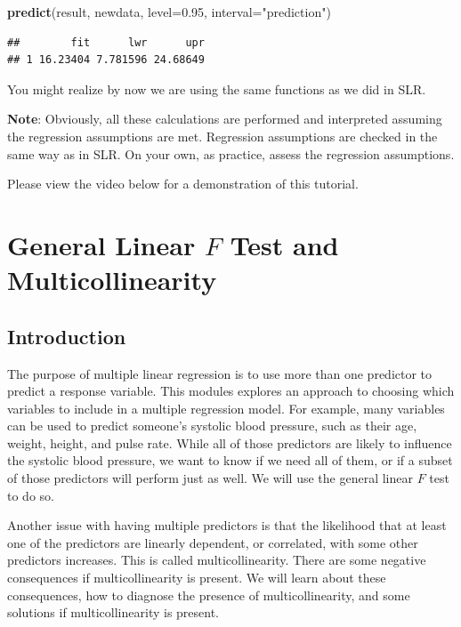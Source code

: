\documentclass[
]{book}
\newenvironment{Shaded}{\begin{snugshade}}{\end{snugshade}}
\newcommand{\AttributeTok}[1]{\textcolor[rgb]{0.13,0.29,0.53}{#1}}
\newcommand{\FloatTok}[1]{\textcolor[rgb]{0.00,0.00,0.81}{#1}}
\newcommand{\FunctionTok}[1]{\textcolor[rgb]{0.13,0.29,0.53}{\textbf{#1}}}
\newcommand{\NormalTok}[1]{#1}
\newcommand{\StringTok}[1]{\textcolor[rgb]{0.31,0.60,0.02}{#1}}
\begin{document}
\begin{Shaded}
\begin{Highlighting}[]
\FunctionTok{predict}\NormalTok{(result, newdata, }\AttributeTok{level=}\FloatTok{0.95}\NormalTok{,}
        \AttributeTok{interval=}\StringTok{"prediction"}\NormalTok{)}
\end{Highlighting}
\end{Shaded}

\begin{verbatim}
##        fit      lwr      upr
## 1 16.23404 7.781596 24.68649
\end{verbatim}

You might realize by now we are using the same functions as we did in SLR.

\textbf{Note}: Obviously, all these calculations are performed and interpreted assuming the regression assumptions are met. Regression assumptions are checked in the same way as in SLR. On your own, as practice, assess the regression assumptions.

Please view the video below for a demonstration of this tutorial.

\hypertarget{genF}{%
\chapter{\texorpdfstring{General Linear \(F\) Test and Multicollinearity}{General Linear F Test and Multicollinearity}}\label{genF}}

\hypertarget{introduction-6}{%
\section{Introduction}\label{introduction-6}}

The purpose of multiple linear regression is to use more than one predictor to predict a response variable. This modules explores an approach to choosing which variables to include in a multiple regression model. For example, many variables can be used to predict someone's systolic blood pressure, such as their age, weight, height, and pulse rate. While all of those predictors are likely to influence the systolic blood pressure, we want to know if we need all of them, or if a subset of those predictors will perform just as well. We will use the general linear \(F\) test to do so.

Another issue with having multiple predictors is that the likelihood that at least one of the predictors are linearly dependent, or correlated, with some other predictors increases. This is called multicollinearity. There are some negative consequences if multicollinearity is present. We will learn about these consequences, how to diagnose the presence of multicollinearity, and some solutions if multicollinearity is present.
\end{document}

